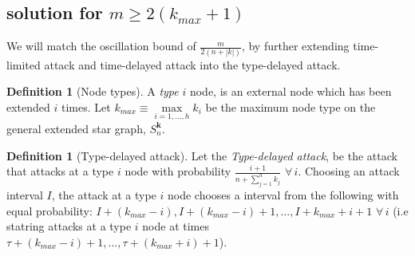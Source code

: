 \documentclass[a4paper,10pt]{article}
\newcommand{\denominator}{\ensuremath{n+\sum\limits_{j=1}^{h} k_{j}}}
\theoremstyle{definition}
\newtheorem{definition}[theorem]{Definition}
\theoremstyle{definition}
\theoremstyle{remark}
\theoremstyle{definition}
\begin{document}
\begin{myfigure}

\end{myfigure} 

\subsection{solution for $m \geq 2(k_{max}+1)$}
We will match the oscillation bound of $\frac{m}{2(n+|k|)}$, by further extending time-limited attack and time-delayed attack into the type-delayed attack.

\begin{definition}[Node types]
A \textit{type} $i$ node, is an external node which has been extended $i$ times. Let $k_{max} \equiv \max\limits_{i=1,...,h} k_{i}$ be the maximum node type on the general extended star graph, $S_{n}^{\bm{k}}$.
\end{definition}

\begin{definition}[Type-delayed attack]
Let  the \textit{Type-delayed attack}, be the attack that attacks at a type $i$ node with probability $\frac{i+1}{\denominator}$ $\forall \, i$. Choosing an attack interval $I$, the attack at a type $i$ node chooses a interval from the following with equal probability: $I+(k_{max}-i),I+(k_{max}-i)+1,...,I+k_{max}+i+1$ $\forall \, i$ (i.e statring attacks at a type $i$ node at times $\tau+(k_{max}-i)+1,...,\tau+(k_{max}+i)+1$).
\end{definition}
\end{document}

